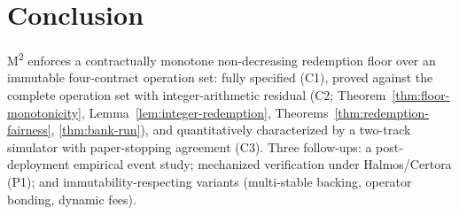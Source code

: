 \section{Conclusion}
\label{sec:conclusion}

M\textsuperscript{2} enforces a contractually monotone non-decreasing redemption floor over an immutable four-contract operation set: fully specified (C1), proved against the complete operation set with integer-arithmetic residual (C2; Theorem~\ref{thm:floor-monotonicity}, Lemma~\ref{lem:integer-redemption}, Theorems~\ref{thm:redemption-fairness}, \ref{thm:bank-run}), and quantitatively characterized by a two-track simulator with paper-stopping agreement (C3). Three follow-ups: a post-deployment empirical event study; mechanized verification under Halmos/Certora (P1); and immutability-respecting variants (multi-stable backing, operator bonding, dynamic fees).
